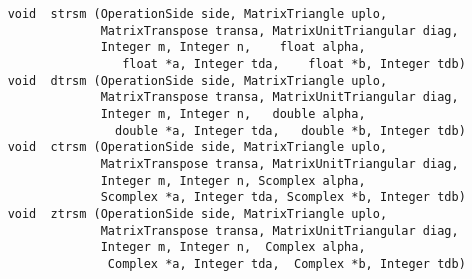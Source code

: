 \footnotesize
\begin{verbatim}
    void  strsm (OperationSide side, MatrixTriangle uplo,
                 MatrixTranspose transa, MatrixUnitTriangular diag,
                 Integer m, Integer n,    float alpha,
                    float *a, Integer tda,    float *b, Integer tdb)
    void  dtrsm (OperationSide side, MatrixTriangle uplo,
                 MatrixTranspose transa, MatrixUnitTriangular diag,
                 Integer m, Integer n,   double alpha,
                   double *a, Integer tda,   double *b, Integer tdb)
    void  ctrsm (OperationSide side, MatrixTriangle uplo,
                 MatrixTranspose transa, MatrixUnitTriangular diag,
                 Integer m, Integer n, Scomplex alpha,
                 Scomplex *a, Integer tda, Scomplex *b, Integer tdb)
    void  ztrsm (OperationSide side, MatrixTriangle uplo,
                 MatrixTranspose transa, MatrixUnitTriangular diag,
                 Integer m, Integer n,  Complex alpha,
                  Complex *a, Integer tda,  Complex *b, Integer tdb)
\end{verbatim}
\normalsize


